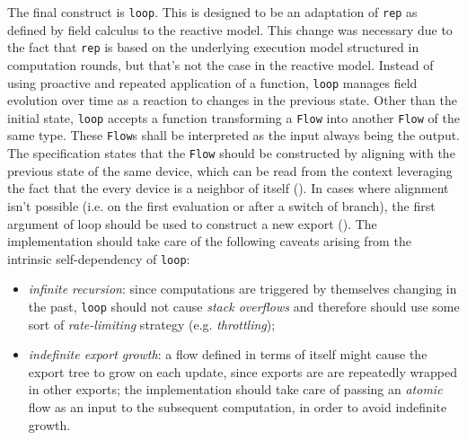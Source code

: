 The final construct is \texttt{loop}.
%
This is designed to be an adaptation of \texttt{rep} as defined by field calculus to the reactive model.
%
This change was necessary due to the fact that \texttt{rep} is based on the underlying execution model structured in computation rounds, but that's not the case in the reactive model.
%
Instead of using proactive and repeated application of a function, \texttt{loop} manages field evolution over time as a reaction to changes in the previous state.
%
Other than the initial state, \texttt{loop} accepts a function transforming a \texttt{Flow} into another \texttt{Flow} of the same type.
%
These \texttt{Flow}s shall be interpreted as the input always being  the output.
%
The specification states that the  \texttt{Flow} should be constructed by aligning with the previous state of the same device, which can be read from the context leveraging the fact that the every device is a neighbor of itself ().
%
In cases where alignment isn't possible (i.e. on the first evaluation or after a switch of branch), the first argument of loop should be used to construct a new export ().
%
The implementation should take care of the following caveats arising from the intrinsic self-dependency of \texttt{loop}:
%
\begin{itemize}
    \item \textit{infinite recursion}: since computations are triggered by themselves changing in the past, \texttt{loop} should not cause \textit{stack overflows} and therefore should use some sort of \textit{rate-limiting} strategy (e.g. \textit{throttling});
    \item \textit{indefinite export growth}: a flow defined in terms of itself might cause the export tree to grow on each update, since exports are are repeatedly wrapped in other exports; the implementation should take care of passing an \textit{atomic} flow as an input to the subsequent computation, in order to avoid indefinite growth.
\end{itemize}
%
